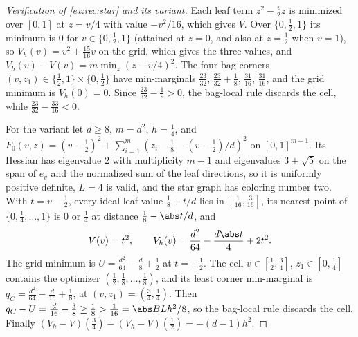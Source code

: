 \begin{proof}[Verification of \cref{ex:rec:star} and its variant]
Each leaf term $z^2-\frac v2z$ is minimized over $[0,1]$ at $z=v/4$ with value
$-v^2/16$, which gives $V$. Over $\{0,\frac12,1\}$ its minimum is $0$ for
$v\in\{0,\frac12,1\}$ (attained at $z=0$, and also at $z=\frac12$ when $v=1$),
so $V_h(v)=v^2+\frac{15}{16}v$ on the grid, which gives the three values, and
$V_h(v)-V(v)=m\min_{z}(z-v/4)^2$. The four bag corners
$(v,z_1)\in\{\frac12,1\}\times\{0,\frac12\}$ have min-marginals
$\frac{23}{32}$, $\frac{23}{32}+\frac18$, $\frac{31}{16}$, $\frac{31}{16}$, and
the grid minimum is $V_h(0)=0$. Since $\frac{23}{32}-\frac18>0$, the bag-local
rule discards the cell, while $\frac{23}{32}-\frac{33}{16}<0$.

For the variant let $d\ge8$, $m=d^2$, $h=\frac14$, and
$F_0(v,z)=(v-\frac12)^2+\sum_{i=1}^m(z_i-\frac18-(v-\frac12)/d)^2$ on
$[0,1]^{m+1}$. Its Hessian has eigenvalue $2$ with multiplicity $m-1$ and
eigenvalues $3\pm\sqrt5$ on the span of $e_v$ and the normalized sum of the leaf
directions, so it is uniformly positive definite, $L=4$ is valid, and the star
graph has coloring number two. With $t=v-\frac12$, every ideal leaf value
$\frac18+t/d$ lies in $[\frac1{16},\frac3{16}]$, its nearest point of
$\{0,\frac14,\ldots,1\}$ is $0$ or $\frac14$ at distance $\frac18-\abs t/d$, and
\[
 V(v)=t^2,\qquad V_h(v)=\frac{d^2}{64}-\frac{d\abs t}4+2t^2 .
\]
The grid minimum is $U=\frac{d^2}{64}-\frac d8+\frac12$ at $t=\pm\frac12$. The
cell $v\in[\frac12,\frac34]$, $z_1\in[0,\frac14]$ contains the optimizer
$(\frac12,\frac18,\ldots,\frac18)$, and its least corner min-marginal is
$q_C=\frac{d^2}{64}-\frac d{16}+\frac18$, at $(v,z_1)=(\frac34,\frac14)$. Then
$q_C-U=\frac d{16}-\frac38\ge\frac18>\frac1{16}=\abs BLh^2/8$, so the bag-local
rule discards the cell. Finally $(V_h-V)(\frac34)-(V_h-V)(\frac12)=-(d-1)h^2$.
\end{proof}

